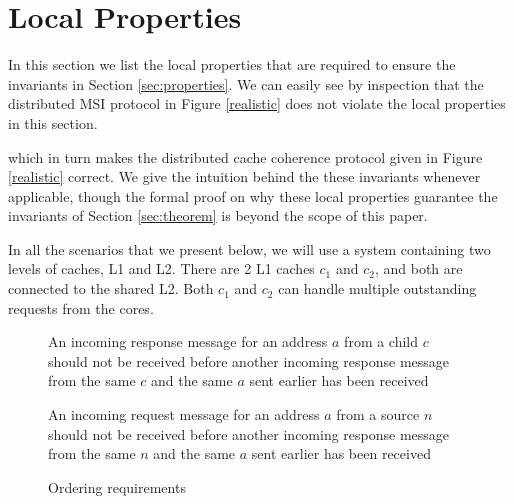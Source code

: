 \section{Local Properties}
\label{sec:localProperties}

In this section we list the local properties that are required to ensure the
invariants in Section \ref{sec:properties}. We can easily see by inspection that the distributed MSI protocol in Figure \ref{realistic} does not violate the local properties in this section.

 which in turn makes the 
distributed cache coherence protocol given in Figure \ref{realistic} correct. We
 give the intuition behind the these invariants whenever applicable, though the
formal proof on why these local properties guarantee the invariants of Section
\ref{sec:theorem} is beyond the scope of this paper.

In all the scenarios that we present below, we will use a system containing two
levels of caches, L1 and L2. There are 2 L1 caches $c_1$ and $c_2$, and both are
connected to the shared L2. Both $c_1$ and $c_2$ can handle multiple outstanding
requests from the cores.


\begin{figure}\small
\begin{inv}
An incoming response message for an address $a$ from a child $c$ should not be
received before another incoming response message from the same $c$ and the
same $a$ sent earlier has been received\label{cRespFifo}
\end{inv}
\begin{inv}
An incoming request message for an address $a$ from a source $n$ should not be
received before another incoming response message from the same $n$ and the
same $a$ sent earlier has been received\label{reqNoOvertakeResp}
\end{inv}
\caption{Ordering requirements}
\label{order}
\end{figure}


